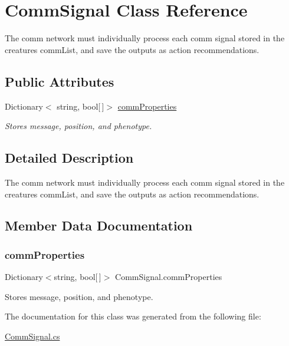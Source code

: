 \hypertarget{class_comm_signal}{}\section{Comm\+Signal Class Reference}
\label{class_comm_signal}


The comm network must individually process each comm signal stored in the creatures comm\+List, and save the outputs as action recommendations.  


\subsection*{Public Attributes}
\begin{DoxyCompactItemize}
\item 
Dictionary$<$ string, bool\mbox{[}$\,$\mbox{]}$>$ \mbox{\hyperlink{class_comm_signal_a417bfc34bf6a9cc2779f2c02fe23ee4b}{comm\+Properties}}
\begin{DoxyCompactList}\small\item\em Stores message, position, and phenotype. \end{DoxyCompactList}\end{DoxyCompactItemize}


\subsection{Detailed Description}
The comm network must individually process each comm signal stored in the creatures comm\+List, and save the outputs as action recommendations. 



\subsection{Member Data Documentation}
\mbox{\label{class_comm_signal_a417bfc34bf6a9cc2779f2c02fe23ee4b}} 
\subsubsection{\texorpdfstring{comm\+Properties}{commProperties}}
{\footnotesize\ttfamily Dictionary$<$string, bool\mbox{[}$\,$\mbox{]}$>$ Comm\+Signal.\+comm\+Properties}



Stores message, position, and phenotype. 



The documentation for this class was generated from the following file\+:\begin{DoxyCompactItemize}
\item 
\mbox{\hyperlink{_comm_signal_8cs}{Comm\+Signal.\+cs}}\end{DoxyCompactItemize}
